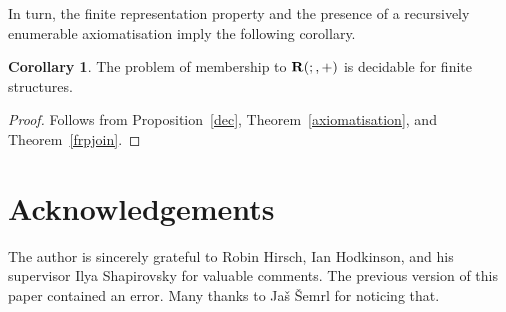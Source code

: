\documentclass[a4paper]{article}
\theoremstyle{definition}
\theoremstyle{theorem}
\theoremstyle{proposition}
\theoremstyle{lemma}
\theoremstyle{ex}
\theoremstyle{corollary}
\newtheorem{corollary}{Corollary}
\theoremstyle{claim}
\begin{document}
In turn, the finite representation property and the presence of a recursively enumerable axiomatisation imply the following corollary.

\begin{corollary}
  The problem of membership to ${\bf R}(;, +)$ is decidable for finite structures.
\end{corollary}

\begin{proof}
  Follows from Proposition~\ref{dec}, Theorem~\ref{axiomatisation}, and Theorem~\ref{frpjoin}.
\end{proof}


\section{Acknowledgements}

The author is sincerely grateful to Robin Hirsch, Ian Hodkinson, and his supervisor Ilya Shapirovsky for valuable comments. The previous version of this paper contained an error. Many thanks to Ja\v{s} \v{S}emrl for noticing that.



\end{document}
